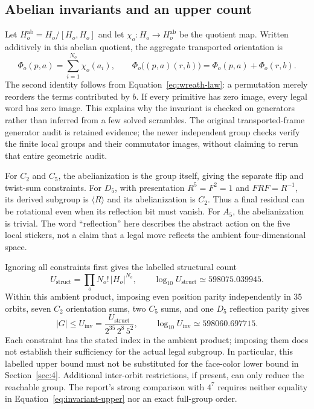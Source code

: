 \documentclass[a4paper,11pt]{article}
\begin{document}
\subsection{Abelian invariants and an upper count}

Let \(H_o^{\mathrm{ab}}=H_o/[H_o,H_o]\) and let \(\chi_o:H_o\to H_o^{\mathrm{ab}}\) be the quotient map. Written additively in this abelian quotient, the aggregate transported orientation is
\begin{equation}
\Phi_o(p,a)=\sum_{i=1}^{N_o}\chi_o(a_i),\qquad
\Phi_o\bigl((p,a)(r,b)\bigr)=\Phi_o(p,a)+\Phi_o(r,b).
\label{eq:abelian-invariant}
\end{equation}
The second identity follows from Equation~\eqref{eq:wreath-law}: a permutation merely reorders the terms contributed by \(b\). If every primitive has zero image, every legal word has zero image. This explains why the invariant is checked on generators rather than inferred from a few solved scrambles. The original transported-frame generator audit is retained evidence; the newer independent group checks verify the finite local groups and their commutator images, without claiming to rerun that entire geometric audit.

For \(C_2\) and \(C_5\), the abelianization is the group itself, giving the separate flip and twist-sum constraints. For \(D_5\), with presentation \(R^5=F^2=1\) and \(FRF=R^{-1}\), its derived subgroup is \(\langle R\rangle\) and its abelianization is \(C_2\). Thus a final residual can be rotational even when its reflection bit must vanish. For \(A_5\), the abelianization is trivial. The word ``reflection'' here describes the abstract action on the five local stickers, not a claim that a legal move reflects the ambient four-dimensional space.

Ignoring all constraints first gives the labelled structural count
\begin{equation}
U_{\mathrm{struct}}=\prod_o N_o!\,|H_o|^{N_o},\qquad
\log_{10}U_{\mathrm{struct}}\simeq598075.039945.
\label{eq:structural-upper}
\end{equation}
Within this ambient product, imposing even position parity independently in 35 orbits, seven \(C_2\) orientation sums, two \(C_5\) sums, and one \(D_5\) reflection parity gives
\begin{equation}
|G|\le U_{\mathrm{inv}}=
\frac{U_{\mathrm{struct}}}{2^{35}\,2^8\,5^2},\qquad
\log_{10}U_{\mathrm{inv}}\simeq598060.697715.
\label{eq:invariant-upper}
\end{equation}
Each constraint has the stated index in the ambient product; imposing them does not establish their sufficiency for the actual legal subgroup. In particular, this labelled upper bound must not be substituted for the face-color lower bound in Section~\ref{sec:4}. Additional inter-orbit restrictions, if present, can only reduce the reachable group. The report's strong comparison with \(4^7\) requires neither equality in Equation~\eqref{eq:invariant-upper} nor an exact full-group order.
\end{document}

